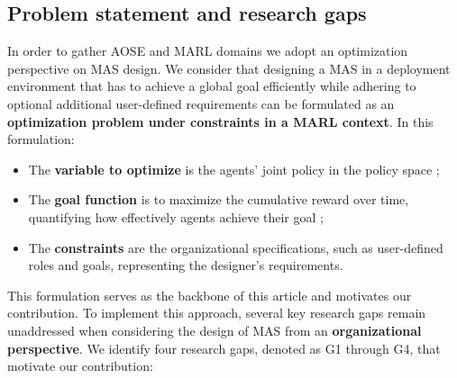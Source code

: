 \documentclass[pdflatex,sn-mathphys-num]{sn-jnl}%
\theoremstyle{thmstyleone}%
\theoremstyle{thmstyletwo}%
\theoremstyle{thmstylethree}%
\begin{document}

\subsection{Problem statement and research gaps}

In order to gather AOSE and MARL domains we adopt an optimization perspective on MAS design. We consider that designing a MAS in a deployment environment that has to achieve a global goal efficiently while adhering to optional additional user-defined requirements can be formulated as an \textbf{optimization problem under constraints in a MARL context}. In this formulation:
\begin{itemize}
    \item The \textbf{variable to optimize} is the agents' joint policy in the policy space ;
    \item The \textbf{goal function} is to maximize the cumulative reward over time, quantifying how effectively agents achieve their goal ;
    \item The \textbf{constraints} are the organizational specifications, such as user-defined roles and goals, representing the designer's requirements.
\end{itemize}
This formulation serves as the backbone of this article and motivates our contribution. 
%
To implement this approach, several key research gaps remain unaddressed when considering the design of MAS from an \textbf{organizational perspective}. We identify four research gaps, denoted as G1 through G4, that motivate our contribution:
%
\end{document}
